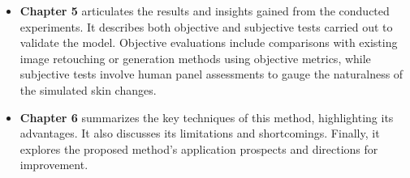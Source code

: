 \begin{spacing}{1.5}
\begin{itemize}
    \item \textbf{Chapter 5} articulates the results and insights gained from the conducted experiments. It describes both objective and subjective tests carried out to validate the model. Objective evaluations include comparisons with existing image retouching or generation methods using objective metrics, while subjective tests involve human panel assessments to gauge the naturalness of the simulated skin changes.
    \item \textbf{Chapter 6} summarizes the key techniques of this method, highlighting its advantages. It also discusses its limitations and shortcomings. Finally, it explores the proposed method's application prospects and directions for improvement.
\end{itemize}

\end{spacing}
\newpage


